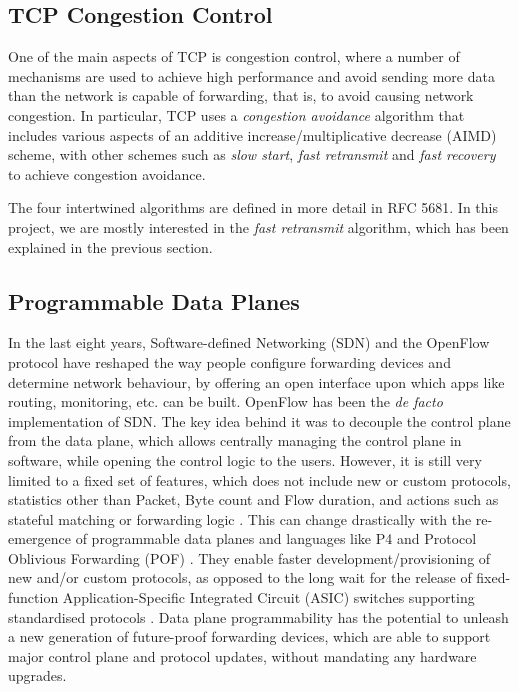 	\subsection{TCP Congestion Control}
	One of the main aspects of TCP is congestion control, where a number of mechanisms are used to achieve high performance and avoid sending more data than the network is capable of forwarding, that is, to avoid causing network congestion. In particular, TCP uses a \textit{congestion avoidance} algorithm that includes various aspects of an additive increase/multiplicative decrease (AIMD) scheme, with other schemes such as \textit{slow start}, \textit{fast retransmit} and \textit{fast recovery} to achieve congestion avoidance. 
	
	The four intertwined algorithms are defined in more detail in RFC 5681\cite{rfc5681}. In this project, we are mostly interested in the \textit{fast retransmit} algorithm, which has been explained in the previous section.
	
	\subsection{Programmable Data Planes}
	In the last eight years, Software-defined Networking (SDN) and the OpenFlow protocol have reshaped the way people configure forwarding devices and determine network behaviour, by offering an open interface upon which apps like routing, monitoring, etc. can be built. OpenFlow has been the \textit{de facto} implementation of SDN. The key idea behind it was to decouple the control plane from the data plane, which allows centrally managing the control plane in software, while opening the control logic to the users. However, it is still very limited to a fixed set of features, which does not include new or custom protocols, statistics other than Packet, Byte count and Flow duration, and actions such as stateful matching or forwarding logic \cite{sdn}. This can change drastically with the re-emergence of programmable data planes and languages like P4 \cite{bosshart2014p4, p4spec, p4.org} and Protocol Oblivious Forwarding (POF) \cite{pof, song2013protocol}. They enable faster development/provisioning of new and/or custom protocols, as opposed to the long wait for the release of fixed-function Application-Specific Integrated Circuit (ASIC) switches supporting standardised protocols \cite{sivaraman2015dc}. Data plane programmability has the potential to unleash a new generation of future-proof forwarding devices, which are able to support major control plane and protocol updates, without mandating any hardware upgrades.

